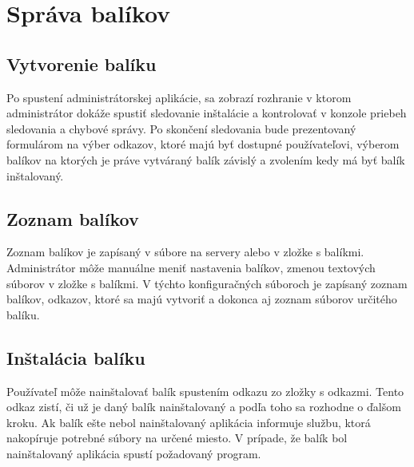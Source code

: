\section{Správa balíkov}
\subsection{Vytvorenie balíku}
Po spustení administrátorskej aplikácie, sa zobrazí rozhranie v ktorom administrátor dokáže spustiť sledovanie inštalácie a kontrolovať v konzole priebeh sledovania a chybové správy. Po skončení sledovania bude prezentovaný formulárom na výber odkazov, ktoré majú byť dostupné používateľovi, výberom balíkov na ktorých je práve vytváraný balík závislý a zvolením kedy má byť balík inštalovaný.

\subsection{Zoznam balíkov}
Zoznam balíkov je zapísaný v súbore na servery alebo v zložke s balíkmi. Administrátor môže manuálne meniť nastavenia balíkov, zmenou textových súborov v zložke s balíkmi. V týchto konfiguračných súboroch je zapísaný zoznam balíkov, odkazov, ktoré sa majú vytvoriť a dokonca aj zoznam súborov určitého balíku.

\subsection{Inštalácia balíku}
Používateľ môže nainštalovať balík spustením odkazu zo zložky s odkazmi. Tento odkaz zistí, či už je daný balík nainštalovaný a podľa toho sa rozhodne o ďalšom kroku. Ak balík ešte nebol nainštalovaný aplikácia informuje službu, ktorá nakopíruje potrebné súbory na určené miesto. V prípade, že balík bol nainštalovaný aplikácia spustí požadovaný program.